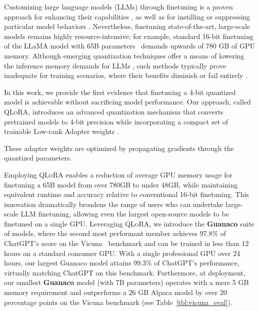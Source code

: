Customizing large language models (LLMs) through finetuning is a proven approach for enhancing their capabilities \citep{min2021metaicl, wei2021finetuned, ouyang2022training, wang2022super, wang2022self, liu2022few}, as well as for instilling or suppressing particular model behaviors \citep{ouyang2022training,askell2021general,bai2022training}. Nevertheless, finetuning state-of-the-art, large-scale models remains highly resource-intensive; for example, standard 16-bit finetuning of the LLaMA model with 65B parameters~\citep{touvron2023llama} demands upwards of 780 GB of GPU memory. Although emerging quantization techniques offer a means of lowering the inference memory demands for LLMs \citep{dettmers2022llm, dettmers2022case, frantar2022gptq, xiao2022smoothquant}, such methods typically prove inadequate for training scenarios, where their benefits diminish or fail entirely \citep{wortsman2023stable}.

In this work, we provide the first evidence that finetuning a 4-bit quantized model is achievable without sacrificing model performance. Our approach, called \textsc{QLoRA}, introduces an advanced quantization mechanism that converts pretrained models to 4-bit precision while incorporating a compact set of trainable Low-rank Adapter weights \citep{hu2021lora}. 

These adapter weights are optimized by propagating gradients through the quantized parameters.

Employing \textsc{QLoRA} enables a reduction of average GPU memory usage for finetuning a 65B model from over 780GB to under 48GB, while maintaining equivalent runtime and accuracy relative to conventional 16-bit finetuning. This innovation dramatically broadens the range of users who can undertake large-scale LLM finetuning, allowing even the largest open-source models to be finetuned on a single GPU. Leveraging \textsc{QLoRA}, we introduce the \textbf{Guanaco} suite of models, where the second most performant member achieves 97.8\% of ChatGPT's score on the Vicuna~\citep{vicuna2023} benchmark and can be trained in less than 12 hours on a standard consumer GPU. With a single professional GPU over 24 hours, our largest Guanaco model attains 99.3\% of ChatGPT's performance, virtually matching ChatGPT on this benchmark. Furthermore, at deployment, our smallest \textbf{Guanaco} model (with 7B parameters) operates with a mere 5 GB memory requirement and outperforms a 26 GB Alpaca model by over 20 percentage points on the Vicuna benchmark (see Table~\ref{tbl:vicuna_eval}).

